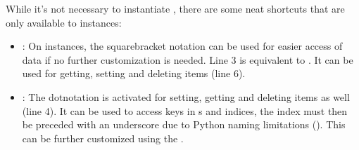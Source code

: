 \documentclass[a4paper,10pt,english]{sphinxmanual}
\begin{document}
\sphinxAtStartPar
While it’s not necessary to instantiate , there are some neat shortcuts that are only available to \sphinxhyphen{}instances:

\begin{sphinxVerbatim}[commandchars=\\\{\},numbers=left,firstnumber=1,stepnumber=1]
  
\PYG{p}{[}\PYG{p}{]}    
  
 \PYG{p}{[}  \PYG{p}{]}  
\end{sphinxVerbatim}
\begin{itemize}
\item {}
\sphinxAtStartPar
{}: On \sphinxhyphen{}instances, the square\sphinxhyphen{}bracket notation can be used for easier access of data if no further customization is needed. Line 3 is equivalent to . It can be used for getting, setting and deleting items (line 6).

\item {}
\sphinxAtStartPar
{}: The dot\sphinxhyphen{}notation is activated for setting, getting and deleting items as well (line 4). It can be used to access \sphinxhyphen{}keys in s and \sphinxhyphen{}indices, the index must then be preceded with an underscore due to Python naming limitations (). This can be further customized using the {\hyperref[\detokenize{README:path-split}]{}} {\hyperref[\detokenize{README:fagus-options}]{}}.

\end{itemize}
\end{document}
